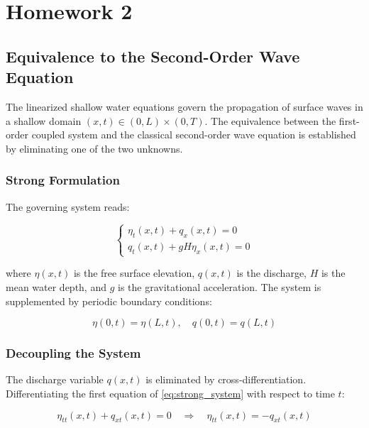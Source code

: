 
\chapter{Homework 2}

\section{Equivalence to the Second-Order Wave Equation}
\label{sc:21}

The linearized shallow water equations govern the propagation of surface waves in a shallow domain \((x,t) \in (0,L) \times (0,T)\). The equivalence between the first-order coupled system and the classical second-order wave equation is established by eliminating one of the two unknowns.

\subsection{Strong Formulation}

The governing system reads:

\begin{equation}
\begin{cases}
\eta_{t}(x,t) + q_{x}(x,t) = 0 \\
q_{t}(x,t) + gH\eta_{x}(x,t) = 0
\end{cases}
\label{eq:strong_system}
\end{equation}

where \(\eta(x,t)\) is the free surface elevation, \(q(x,t)\) is the discharge, \(H\) is the mean water depth, and \(g\) is the gravitational acceleration. The system is supplemented by periodic boundary conditions:

\begin{equation}
\eta(0,t) = \eta(L,t), \quad q(0,t) = q(L,t)
\label{eq:bc_initial}
\end{equation}

\subsection{Decoupling the System}

The discharge variable \(q(x,t)\) is eliminated by cross-differentiation. Differentiating the first equation of \eqref{eq:strong_system} with respect to time \(t\):

\begin{equation}
\eta_{tt}(x,t) + q_{xt}(x,t) = 0 \quad \Longrightarrow \quad \eta_{tt}(x,t) = -q_{xt}(x,t)
\label{eq:eta_tt}
\end{equation}


